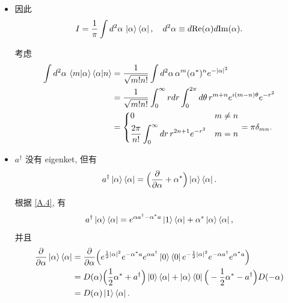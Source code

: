 \documentclass[10pt, a4paper]{article}
\numberwithin{equation}{section}
\begin{document}
\begin{itemize}
		\item 因此
		\begin{equation}
			I = \frac{1}{\pi} \int d^2 \alpha \, \ket{\alpha} \bra{\alpha}, \quad d^2 \alpha \equiv d\mathrm{Re}(\alpha) d\mathrm{Im}(\alpha).
		\end{equation}
		
		\begin{tcolorbox}[title=proof:]
			考虑
			\begin{align}
				\int d^2 \alpha \, \braket{m | \alpha} \braket{\alpha | n} &= \frac{1}{\sqrt{m! n!}} \int d^2 \alpha \, \alpha^m (\alpha^*)^n e^{- |\alpha|^2} \notag \\
				&= \frac{1}{\sqrt{m! n!}} \int_0^\infty r dr \int_0^{2 \pi} d\theta \, r^{m + n} e^{i (m - n) \theta} e^{- r^2} \notag \\
				&= \begin{dcases}
					0 & m \neq n \\
					\frac{2 \pi}{n!} \int_0^\infty dr \, r^{2 n + 1} e^{- r^2} & m = n
				\end{dcases} = \pi \delta_{m n}.
			\end{align}
		\end{tcolorbox}
		
		\item $a^\dag$ 没有 eigenket, 但有
		\begin{equation}
			a^\dag \ket{\alpha} \bra{\alpha} = \Big( \frac{\partial}{\partial \alpha} + \alpha^* \Big) \ket{\alpha} \bra{\alpha}.
		\end{equation}
		
		\begin{tcolorbox}[title=proof:]
			根据 \eqref{A.4}, 有
			\begin{equation}
				a^\dag \ket{\alpha} \bra{\alpha} = e^{\alpha a^\dag - \alpha^* a} \ket{1} \bra{\alpha} + \alpha^* \ket{\alpha} \bra{\alpha},
			\end{equation}
			并且
			\begin{align}
				\frac{\partial}{\partial \alpha} \ket{\alpha} \bra{\alpha} &= \frac{\partial}{\partial \alpha} \Big( e^{\frac{1}{2} |\alpha|^2} e^{- \alpha^* a} e^{\alpha a^\dag} \ket{0} \bra{0} e^{- \frac{1}{2} |\alpha|^2} e^{- \alpha a^\dag} e^{\alpha^* a} \Big) \notag \\
				&= D(\alpha) \Big( \frac{1}{2} \alpha^* + a^\dag \Big) \ket{0} \bra{\alpha} + \ket{\alpha} \bra{0} \Big( - \frac{1}{2} \alpha^* - a^\dag \Big) D(- \alpha) \notag \\
				&= D(\alpha) \ket{1} \bra{\alpha}.
			\end{align}
		\end{tcolorbox}
	\end{itemize}
	
\end{document}
